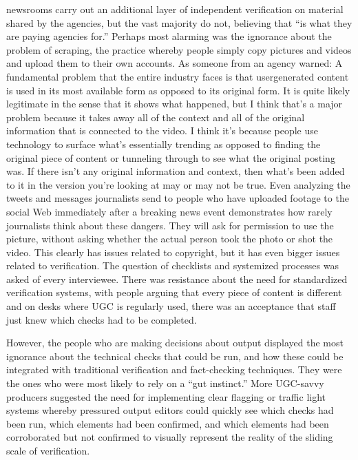 \begin{enumerate}
newsrooms carry out an additional layer of independent verification on
material shared by the agencies, but the vast majority do not, believing that
``is what they are paying agencies for.''
Perhaps most alarming was the ignorance about the problem of scraping,
the practice whereby people simply copy pictures and videos and upload
them to their own accounts. As someone from an agency warned:
A fundamental problem that the entire industry faces is that usergenerated
content is used in its most available form as opposed to
its original form. It is quite likely legitimate in the sense that it shows
what happened, but I think that's a major problem because it takes
away all of the context and all of the original information that is connected
to the video. I think it's because people use technology to
surface what's essentially trending as opposed to finding the original
piece of content or tunneling through to see what the original
posting was. If there isn't any original information and context, then
what's been added to it in the version you're looking at may or may
not be true.
Even analyzing the tweets and messages journalists send to people who
have uploaded footage to the social Web immediately after a breaking news
event demonstrates how rarely journalists think about these dangers. They
will ask for permission to use the picture, without asking whether the actual
person took the photo or shot the video. This clearly has issues related to
copyright, but it has even bigger issues related to verification.
The question of checklists and systemized processes was asked of every
interviewee. There was resistance about the need for standardized verification
systems, with people arguing that every piece of content is different
and on desks where UGC is regularly used, there was an acceptance that
staff just knew which checks had to be completed.

However, the people who are making decisions about output displayed
the most ignorance about the technical checks that could be run, and how
these could be integrated with traditional verification and fact-checking
techniques. They were the ones who were most likely to rely on a ``gut
instinct.'' More UGC-savvy producers suggested the need for implementing
clear flagging or traffic light systems whereby pressured output editors
could quickly see which checks had been run, which elements had been
confirmed, and which elements had been corroborated but not confirmed
to visually represent the reality of the sliding scale of verification.

\end{enumerate}
